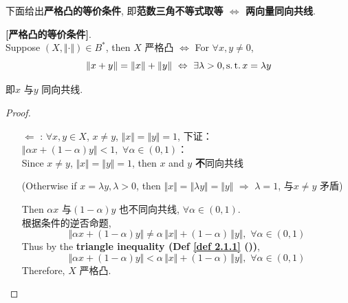 	\vspace{2em}
	
	下面给出\textbf{严格凸的等价条件}, 即\textbf{范数三角不等式取等 $\Leftrightarrow$ 两向量同向共线}. 
	
	\newpage
	
	\begin{proposition}\label{prop 2.3.1}
		\textbf{[严格凸的等价条件]}. \\
		Suppose $(X , \Vert \cdot \Vert) \in B^*$, then $X$ 严格凸 $\Leftrightarrow$ For $\forall x , y \neq 0$, 
		\[ \Vert x + y \Vert = \Vert x \Vert + \Vert y \Vert \,\, \Leftrightarrow \,\, \exists \lambda > 0 , \operatorname{s.t.} x = \lambda y \]
		\begin{center}
			即$x$ 与$y$ 同向共线.
		\end{center}
		
		\vspace{1em}
		
		\begin{proof}
			\begin{enumerate}
				\item[$\Leftarrow$]: $\forall x , y \in X$, $x \neq y$, $\Vert x \Vert = \Vert y \Vert = 1$, 下证：$\Vert \alpha x + (1 - \alpha) y \Vert < 1 , \,\, \forall \alpha \in (0 , 1)$：\\
				Since $x \neq y$, $\Vert x \Vert = \Vert y \Vert = 1$, then $x$ and $y$ \textbf{不}同向共线
				\begin{center}
					(Otherwise if $x = \lambda y , \lambda > 0$, then $\Vert x \Vert = \Vert \lambda y \Vert = \Vert y \Vert \,\, \Rightarrow \,\, \lambda = 1$, 与$x \neq y$ 矛盾)
				\end{center}
				Then $\alpha x$ 与$(1 - \alpha) y$ 也不同向共线, $\forall \alpha \in (0 , 1)$. \\
				根据条件的逆否命题, 
				\[ \Vert \alpha x + (1 - \alpha) y \Vert \neq \alpha \, \Vert x \Vert + (1 - \alpha) \, \Vert y \Vert , \,\, \forall \alpha \in (0 , 1) \]
				Thus by the \textbf{triangle inequality (Def \ref{def 2.1.1} ())}, 
				\[ \Vert \alpha x + (1 - \alpha) y \Vert < \alpha \, \Vert x \Vert + (1 - \alpha) \, \Vert y \Vert , \,\, \forall \alpha \in (0 , 1) \]
				Therefore, $X$ 严格凸. 
				
				\vspace{4em}
				

\end{enumerate}
\end{proof}
\end{proposition}
